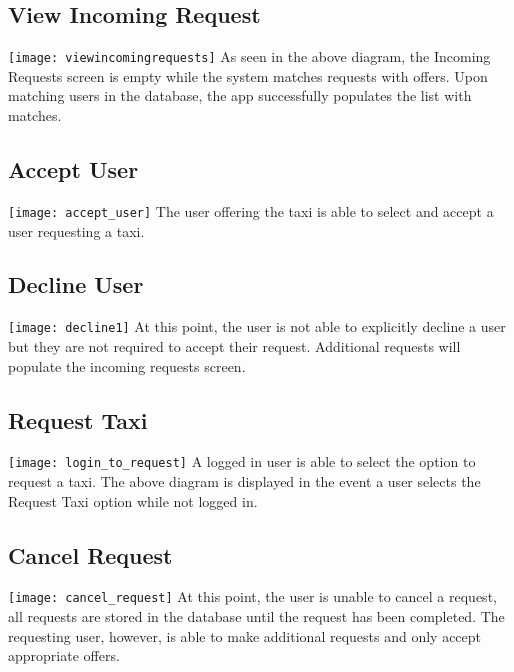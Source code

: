 \documentclass[english]{article}
\begin{document}
\subsection{View Incoming Request}
\texttt{[image: viewincomingrequests]}
\newline
As seen in the above diagram, the Incoming Requests screen is empty while the system matches requests with offers. Upon matching users in the database, the app successfully populates the list with matches. 

\subsection{Accept User}
\texttt{[image: accept\_user]}
The user offering the taxi is able to select and accept a user requesting a taxi. 

\subsection{Decline User}
\texttt{[image: decline1]}
At this point, the user is not able to explicitly decline a user but they are not required to accept their request. Additional requests will populate the incoming requests screen. 

\subsection{Request Taxi}
\texttt{[image: login\_to\_request]}
\newline
A logged in user is able to select the option to request a taxi. The above diagram is displayed in the event a user selects the Request Taxi option while not logged in. 

\subsection{Cancel Request}
\texttt{[image: cancel\_request]}
At this point, the user is unable to cancel a request, all requests are stored in the database until the request has been completed. The requesting user, however, is able to make additional requests and only accept appropriate offers. 
\end{document}
